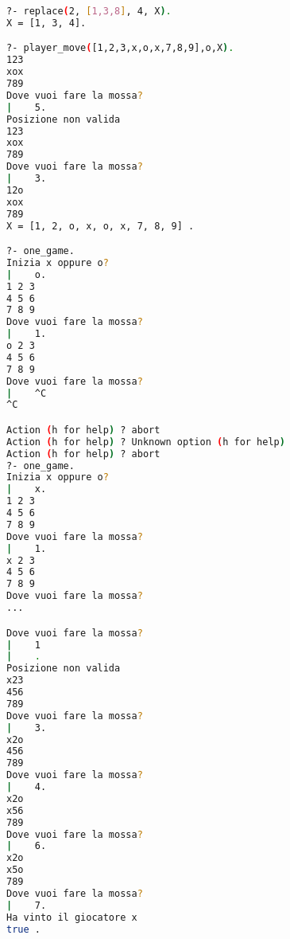 \documentclass[a4paper,12pt, oneside]{book}
\begin{document}
\begin{esercizio}
\begin{shaded}
\begin{lstlisting}[language=bash]
?- replace(2, [1,3,8], 4, X).
X = [1, 3, 4].

?- player_move([1,2,3,x,o,x,7,8,9],o,X).
123
xox
789
Dove vuoi fare la mossa?
|    5.
Posizione non valida
123
xox
789
Dove vuoi fare la mossa?
|    3.
12o
xox
789
X = [1, 2, o, x, o, x, 7, 8, 9] .

?- one_game.
Inizia x oppure o?
|    o.
1 2 3 
4 5 6 
7 8 9 
Dove vuoi fare la mossa?
|    1.
o 2 3 
4 5 6 
7 8 9 
Dove vuoi fare la mossa?
|    ^C
^C

Action (h for help) ? abort
Action (h for help) ? Unknown option (h for help)
Action (h for help) ? abort
?- one_game.
Inizia x oppure o?
|    x.
1 2 3 
4 5 6 
7 8 9 
Dove vuoi fare la mossa?
|    1.
x 2 3 
4 5 6 
7 8 9 
Dove vuoi fare la mossa?
...

Dove vuoi fare la mossa?
|    1
|    .
Posizione non valida
x23
456
789
Dove vuoi fare la mossa?
|    3.
x2o
456
789
Dove vuoi fare la mossa?
|    4.
x2o
x56
789
Dove vuoi fare la mossa?
|    6.
x2o
x5o
789
Dove vuoi fare la mossa?
|    7.
Ha vinto il giocatore x
true .

\end{lstlisting}
\end{shaded}
\end{esercizio}
\end{document}
